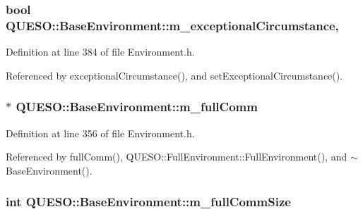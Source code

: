 \hypertarget{class_q_u_e_s_o_1_1_base_environment_a2a58407f6c1affeb73ce5fb33c541412}{
\subsubsection[{m\-\_\-exceptional\-Circumstance}]{\setlength{\rightskip}{0pt plus 5cm}bool Q\-U\-E\-S\-O\-::\-Base\-Environment\-::m\-\_\-exceptional\-Circumstance\hspace{0.3cm}{\ttfamily [mutable]}, {\ttfamily [protected]}}}\label{class_q_u_e_s_o_1_1_base_environment_a2a58407f6c1affeb73ce5fb33c541412}


Definition at line 384 of file Environment.\-h.



Referenced by exceptional\-Circumstance(), and set\-Exceptional\-Circumstance().

\hypertarget{class_q_u_e_s_o_1_1_base_environment_a8e80c9067b0875c419f1b9ecccbdb46d}{
\subsubsection[{m\-\_\-full\-Comm}]{$\ast$ Q\-U\-E\-S\-O\-::\-Base\-Environment\-::m\-\_\-full\-Comm\hspace{0.3cm}{\ttfamily [protected]}}}\label{class_q_u_e_s_o_1_1_base_environment_a8e80c9067b0875c419f1b9ecccbdb46d}


Definition at line 356 of file Environment.\-h.



Referenced by full\-Comm(), Q\-U\-E\-S\-O\-::\-Full\-Environment\-::\-Full\-Environment(), and $\sim$\-Base\-Environment().

\hypertarget{class_q_u_e_s_o_1_1_base_environment_ad5be3e52676db90de1321bc94233c15d}{
\subsubsection[{m\-\_\-full\-Comm\-Size}]{\setlength{\rightskip}{0pt plus 5cm}int Q\-U\-E\-S\-O\-::\-Base\-Environment\-::m\-\_\-full\-Comm\-Size\hspace{0.3cm}{\ttfamily [protected]}}}\label{class_q_u_e_s_o_1_1_base_environment_ad5be3e52676db90de1321bc94233c15d}


